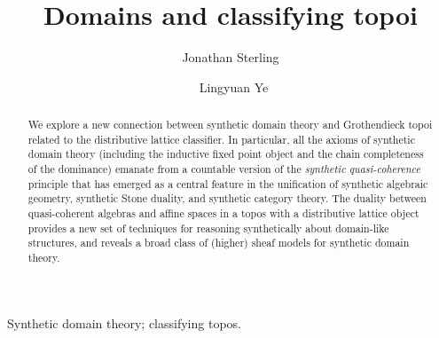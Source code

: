 \documentclass{msc}
\theoremstyle{theormstyle}
\theoremstyle{remarkstyle}
\begin{document}


\title{Domains and classifying topoi}

\begin{authgrp}
\author{Jonathan Sterling}
\author{\ Lingyuan Ye} %
\end{authgrp}


\begin{abstract}
  We explore a new connection between synthetic domain theory and Grothendieck topoi related to the distributive lattice classifier. In particular, all the axioms of synthetic domain theory (including the inductive fixed point object and the chain completeness of the dominance) emanate from a countable version of the \emph{synthetic quasi-coherence} principle that has emerged as a central feature in the unification of synthetic algebraic geometry, synthetic Stone duality, and synthetic category theory. The duality between quasi-coherent algebras and affine spaces in a topos with a distributive lattice object provides a new set of techniques for reasoning synthetically about domain-like structures, and reveals a broad class of (higher) sheaf models for synthetic domain theory.
\end{abstract}

\begin{keywords}
  Synthetic domain theory; classifying topos.
\end{keywords}

\maketitle


\end{document}
